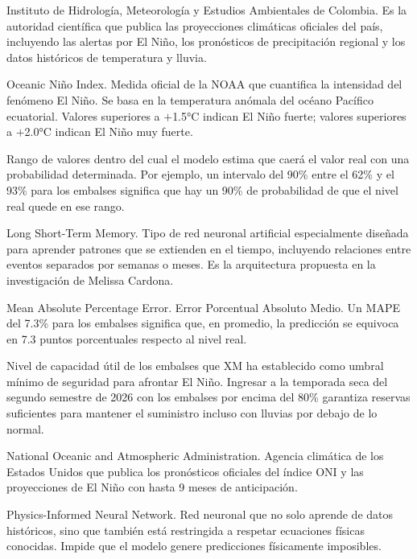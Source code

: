 \documentclass[11pt,a4paper]{article}
\begin{document}
\begin{small}
{\begin{description}[leftmargin=*,style=nextline,font=\bfseries\color{titleblue},itemsep=5pt]
\item[IDEAM]
Instituto de Hidrología, Meteorología y Estudios Ambientales de Colombia. Es la autoridad científica que publica las proyecciones climáticas oficiales del país, incluyendo las alertas por El Niño, los pronósticos de precipitación regional y los datos históricos de temperatura y lluvia.

\item[Índice ONI]
Oceanic Niño Index. Medida oficial de la NOAA que cuantifica la intensidad del fenómeno El Niño. Se basa en la temperatura anómala del océano Pacífico ecuatorial. Valores superiores a $+$1.5°C indican El Niño fuerte; valores superiores a $+$2.0°C indican El Niño muy fuerte.

\item[Intervalo de confianza]
Rango de valores dentro del cual el modelo estima que caerá el valor real con una probabilidad determinada. Por ejemplo, un intervalo del 90\% entre el 62\% y el 93\% para los embalses significa que hay un 90\% de probabilidad de que el nivel real quede en ese rango.

\item[LSTM]
Long Short-Term Memory. Tipo de red neuronal artificial especialmente diseñada para aprender patrones que se extienden en el tiempo, incluyendo relaciones entre eventos separados por semanas o meses. Es la arquitectura propuesta en la investigación de Melissa Cardona.

\item[MAPE]
Mean Absolute Percentage Error. Error Porcentual Absoluto Medio. Un MAPE del 7.3\% para los embalses significa que, en promedio, la predicción se equivoca en 7.3 puntos porcentuales respecto al nivel real.

\item[Meta del 80\%]
Nivel de capacidad útil de los embalses que XM ha establecido como umbral mínimo de seguridad para afrontar El Niño. Ingresar a la temporada seca del segundo semestre de 2026 con los embalses por encima del 80\% garantiza reservas suficientes para mantener el suministro incluso con lluvias por debajo de lo normal.

\item[NOAA]
National Oceanic and Atmospheric Administration. Agencia climática de los Estados Unidos que publica los pronósticos oficiales del índice ONI y las proyecciones de El Niño con hasta 9 meses de anticipación.

\item[PINN]
Physics-Informed Neural Network. Red neuronal que no solo aprende de datos históricos, sino que también está restringida a respetar ecuaciones físicas conocidas. Impide que el modelo genere predicciones físicamente imposibles.


\end{description}}
\end{small}
\end{document}
